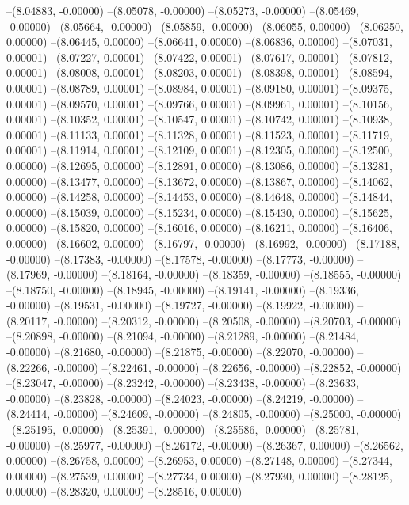 --(8.04883, -0.00000)
--(8.05078, -0.00000)
--(8.05273, -0.00000)
--(8.05469, -0.00000)
--(8.05664, -0.00000)
--(8.05859, -0.00000)
--(8.06055, 0.00000)
--(8.06250, 0.00000)
--(8.06445, 0.00000)
--(8.06641, 0.00000)
--(8.06836, 0.00000)
--(8.07031, 0.00001)
--(8.07227, 0.00001)
--(8.07422, 0.00001)
--(8.07617, 0.00001)
--(8.07812, 0.00001)
--(8.08008, 0.00001)
--(8.08203, 0.00001)
--(8.08398, 0.00001)
--(8.08594, 0.00001)
--(8.08789, 0.00001)
--(8.08984, 0.00001)
--(8.09180, 0.00001)
--(8.09375, 0.00001)
--(8.09570, 0.00001)
--(8.09766, 0.00001)
--(8.09961, 0.00001)
--(8.10156, 0.00001)
--(8.10352, 0.00001)
--(8.10547, 0.00001)
--(8.10742, 0.00001)
--(8.10938, 0.00001)
--(8.11133, 0.00001)
--(8.11328, 0.00001)
--(8.11523, 0.00001)
--(8.11719, 0.00001)
--(8.11914, 0.00001)
--(8.12109, 0.00001)
--(8.12305, 0.00000)
--(8.12500, 0.00000)
--(8.12695, 0.00000)
--(8.12891, 0.00000)
--(8.13086, 0.00000)
--(8.13281, 0.00000)
--(8.13477, 0.00000)
--(8.13672, 0.00000)
--(8.13867, 0.00000)
--(8.14062, 0.00000)
--(8.14258, 0.00000)
--(8.14453, 0.00000)
--(8.14648, 0.00000)
--(8.14844, 0.00000)
--(8.15039, 0.00000)
--(8.15234, 0.00000)
--(8.15430, 0.00000)
--(8.15625, 0.00000)
--(8.15820, 0.00000)
--(8.16016, 0.00000)
--(8.16211, 0.00000)
--(8.16406, 0.00000)
--(8.16602, 0.00000)
--(8.16797, -0.00000)
--(8.16992, -0.00000)
--(8.17188, -0.00000)
--(8.17383, -0.00000)
--(8.17578, -0.00000)
--(8.17773, -0.00000)
--(8.17969, -0.00000)
--(8.18164, -0.00000)
--(8.18359, -0.00000)
--(8.18555, -0.00000)
--(8.18750, -0.00000)
--(8.18945, -0.00000)
--(8.19141, -0.00000)
--(8.19336, -0.00000)
--(8.19531, -0.00000)
--(8.19727, -0.00000)
--(8.19922, -0.00000)
--(8.20117, -0.00000)
--(8.20312, -0.00000)
--(8.20508, -0.00000)
--(8.20703, -0.00000)
--(8.20898, -0.00000)
--(8.21094, -0.00000)
--(8.21289, -0.00000)
--(8.21484, -0.00000)
--(8.21680, -0.00000)
--(8.21875, -0.00000)
--(8.22070, -0.00000)
--(8.22266, -0.00000)
--(8.22461, -0.00000)
--(8.22656, -0.00000)
--(8.22852, -0.00000)
--(8.23047, -0.00000)
--(8.23242, -0.00000)
--(8.23438, -0.00000)
--(8.23633, -0.00000)
--(8.23828, -0.00000)
--(8.24023, -0.00000)
--(8.24219, -0.00000)
--(8.24414, -0.00000)
--(8.24609, -0.00000)
--(8.24805, -0.00000)
--(8.25000, -0.00000)
--(8.25195, -0.00000)
--(8.25391, -0.00000)
--(8.25586, -0.00000)
--(8.25781, -0.00000)
--(8.25977, -0.00000)
--(8.26172, -0.00000)
--(8.26367, 0.00000)
--(8.26562, 0.00000)
--(8.26758, 0.00000)
--(8.26953, 0.00000)
--(8.27148, 0.00000)
--(8.27344, 0.00000)
--(8.27539, 0.00000)
--(8.27734, 0.00000)
--(8.27930, 0.00000)
--(8.28125, 0.00000)
--(8.28320, 0.00000)
--(8.28516, 0.00000)
